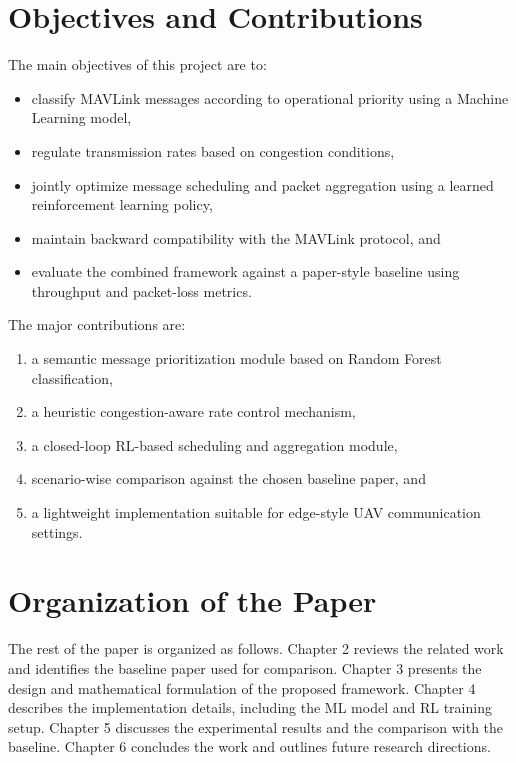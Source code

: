 \section{Objectives and Contributions}

The main objectives of this project are to:

\begin{itemize}
	\item classify MAVLink messages according to operational priority using a Machine Learning model,
	\item regulate transmission rates based on congestion conditions,
	\item jointly optimize message scheduling and packet aggregation using a learned reinforcement learning policy,
	\item maintain backward compatibility with the MAVLink protocol, and
	\item evaluate the combined framework against a paper-style baseline using throughput and packet-loss metrics.
\end{itemize}

The major contributions are:

\begin{enumerate}
	\item a semantic message prioritization module based on Random Forest classification,
	\item a heuristic congestion-aware rate control mechanism,
	\item a closed-loop RL-based scheduling and aggregation module,
	\item scenario-wise comparison against the chosen baseline paper, and
	\item a lightweight implementation suitable for edge-style UAV communication settings.
\end{enumerate}

\section{Organization of the Paper}

The rest of the paper is organized as follows. Chapter 2 reviews the 
related work and identifies the baseline paper used for comparison. 
Chapter 3 presents the design and mathematical formulation of the 
proposed framework. Chapter 4 describes the implementation details, 
including the ML model and RL training setup. Chapter 5 discusses the 
experimental results and the comparison with the baseline. Chapter 6 
concludes the work and outlines future research directions.

